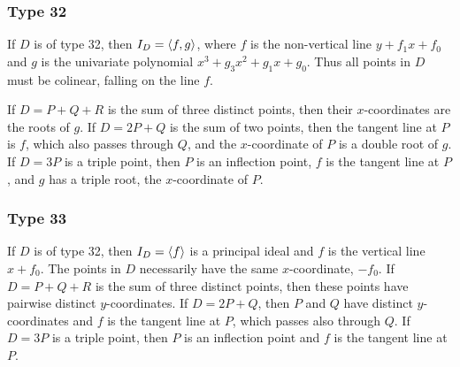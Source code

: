 \subsubsection{Type 32}
  If $D$ is of type 32, then $I_D = \left\langle f, g \right\rangle$, where $f$ is the non-vertical line $y + f_1x + f_0$
  and $g$ is the univariate polynomial $x^3 + g_3x^2 + g_1x + g_0$.
  Thus all points in $D$ must be colinear, falling on the line $f$.
  
  If $D = P + Q + R$ is the sum of three distinct points, then their $x$-coordinates are the roots of $g$.
  If $D = 2P + Q$ is the sum of two points, then the tangent line at $P$ is $f$, which also passes through $Q$,
  and the $x$-coordinate of $P$ is a double root of $g$.
  If $D = 3P$ is a triple point, then $P$ is an inflection point, $f$ is the tangent line at $P$, and $g$ has a triple root,
  the $x$-coordinate of $P$.

\subsubsection{Type 33}
  If $D$ is of type 32, then $I_D = \left\langle f \right\rangle$ is a principal ideal and $f$ is the vertical line $x + f_0$.
  The points in $D$ necessarily have the same $x$-coordinate, $-f_0$.
  If $D = P + Q + R$ is the sum of three distinct points, then these points have pairwise distinct $y$-coordinates.
  If $D = 2P + Q$, then $P$ and $Q$ have distinct $y$-coordinates and $f$ is the tangent line at $P$, which passes also through $Q$.
  If $D = 3P$ is a triple point, then $P$ is an inflection point and $f$ is the tangent line at $P$.




